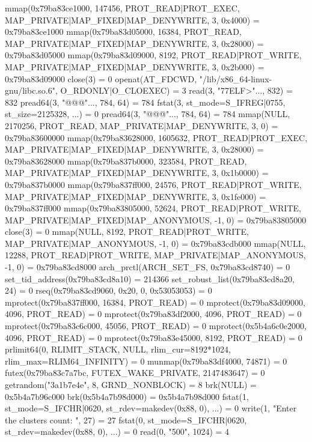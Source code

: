 \begin{breakableverbatim}
mmap(0x79ba83ce1000, 147456, PROT_READ|PROT_EXEC, MAP_PRIVATE|MAP_FIXED|MAP_DENYWRITE, 3, 0x4000) = 0x79ba83ce1000
mmap(0x79ba83d05000, 16384, PROT_READ, MAP_PRIVATE|MAP_FIXED|MAP_DENYWRITE, 3, 0x28000) = 0x79ba83d05000
mmap(0x79ba83d09000, 8192, PROT_READ|PROT_WRITE, MAP_PRIVATE|MAP_FIXED|MAP_DENYWRITE, 3, 0x2b000) = 0x79ba83d09000
close(3)                                = 0
openat(AT_FDCWD, "/lib/x86_64-linux-gnu/libc.so.6", O_RDONLY|O_CLOEXEC) = 3
read(3, "\177ELF\2\1\1\3\0\0\0\0\0\0\0\0\3\0>\0\1\0\0\0\2\0\0\0\0\0"..., 832) = 832
pread64(3, "\6\0\0\0\4\0\0\0@\0\0\0\0\0\0\0@\0\0\0\0\0\0\0@\0\0\0\0\0\0\0"..., 784, 64) = 784
fstat(3, {st_mode=S_IFREG|0755, st_size=2125328, ...}) = 0
pread64(3, "\6\0\0\0\4\0\0\0@\0\0\0\0\0\0\0@\0\0\0\0\0\0\0@\0\0\0\0\0\0\0"..., 784, 64) = 784
mmap(NULL, 2170256, PROT_READ, MAP_PRIVATE|MAP_DENYWRITE, 3, 0) = 0x79ba83600000
mmap(0x79ba83628000, 1605632, PROT_READ|PROT_EXEC, MAP_PRIVATE|MAP_FIXED|MAP_DENYWRITE, 3, 0x28000) = 0x79ba83628000
mmap(0x79ba837b0000, 323584, PROT_READ, MAP_PRIVATE|MAP_FIXED|MAP_DENYWRITE, 3, 0x1b0000) = 0x79ba837b0000
mmap(0x79ba837ff000, 24576, PROT_READ|PROT_WRITE, MAP_PRIVATE|MAP_FIXED|MAP_DENYWRITE, 3, 0x1fe000) = 0x79ba837ff000
mmap(0x79ba83805000, 52624, PROT_READ|PROT_WRITE, MAP_PRIVATE|MAP_FIXED|MAP_ANONYMOUS, -1, 0) = 0x79ba83805000
close(3)                                = 0
mmap(NULL, 8192, PROT_READ|PROT_WRITE, MAP_PRIVATE|MAP_ANONYMOUS, -1, 0) = 0x79ba83cdb000
mmap(NULL, 12288, PROT_READ|PROT_WRITE, MAP_PRIVATE|MAP_ANONYMOUS, -1, 0) = 0x79ba83cd8000
arch_prctl(ARCH_SET_FS, 0x79ba83cd8740) = 0
set_tid_address(0x79ba83cd8a10)         = 214366
set_robust_list(0x79ba83cd8a20, 24)     = 0
rseq(0x79ba83cd9060, 0x20, 0, 0x53053053) = 0
mprotect(0x79ba837ff000, 16384, PROT_READ) = 0
mprotect(0x79ba83d09000, 4096, PROT_READ) = 0
mprotect(0x79ba83df2000, 4096, PROT_READ) = 0
mprotect(0x79ba83c6c000, 45056, PROT_READ) = 0
mprotect(0x5b4a6c0e2000, 4096, PROT_READ) = 0
mprotect(0x79ba83e45000, 8192, PROT_READ) = 0
prlimit64(0, RLIMIT_STACK, NULL, {rlim_cur=8192*1024, rlim_max=RLIM64_INFINITY}) = 0
munmap(0x79ba83df4000, 74871)           = 0
futex(0x79ba83c7a7bc, FUTEX_WAKE_PRIVATE, 2147483647) = 0
getrandom("\x3a\x1b\x7e\x4e\xed", 8, GRND_NONBLOCK) = 8
brk(NULL)                               = 0x5b4a7b96c000
brk(0x5b4a7b98d000)                     = 0x5b4a7b98d000
fstat(1, {st_mode=S_IFCHR|0620, st_rdev=makedev(0x88, 0), ...}) = 0
write(1, "Enter the clusters count: \n", 27) = 27
fstat(0, {st_mode=S_IFCHR|0620, st_rdev=makedev(0x88, 0), ...}) = 0
read(0, "500\n", 1024)                  = 4

\end{breakableverbatim}
